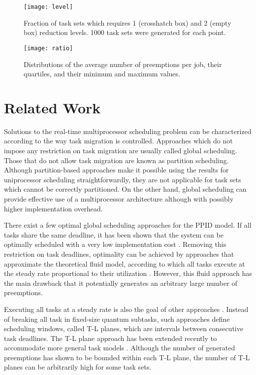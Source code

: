 \documentclass[twocolumn, compsocconf]{IEEEtran}
\newcounter{proc}
\begin{document}
\begin{figure}[t]
\texttt{[image: level]}
  \caption{Fraction of task sets which requires 1 (crosshatch box) and 2 (empty
    box) reduction levels. 1000 task sets were generated for each point.}
  \label{fig:level}
\end{figure}

\begin{figure}[t]
\texttt{[image: ratio]}
  \caption{Distributions of the average number of preemptions per job, their
    quartiles, and their minimum and maximum values.}
  \label{fig:ratio}
\end{figure}

\section{Related Work}\label{sec:relatedWork}

Solutions to the real-time multiprocessor scheduling problem can be
characterized according to the way task migration is controlled. Approaches
which do not impose any restriction on task migration are usually called global
scheduling. Those that do not allow task migration are known as partition
scheduling. Although partition-based approaches make it possible using the
results for uniprocessor scheduling straightforwardly, they are not applicable
for task sets which cannot be correctly partitioned. On the other hand, global
scheduling can provide effective use of a multiprocessor architecture although
with possibly higher implementation overhead.

There exist a few optimal global scheduling approaches for the PPID model. If
all tasks share the same deadline, it has been shown that the system can be
optimally scheduled with a very low implementation cost
\cite{McNaughton59}. Removing this restriction on task deadlines, optimality can
be achieved by approaches that approximate the theoretical fluid model,
according to which all tasks execute at the steady rate proportional to their
utilization \cite{Baruah96}. However, this fluid approach has the main drawback
that it potentially generates an arbitrary large number of preemptions.

Executing all tasks at a steady rate is also the goal of other approaches
\cite{Cho06,Funaoka08}. Instead of breaking all task in fixed-size quantum
subtasks, such approaches define scheduling windows, called T-L planes, which
are intervals between consecutive task deadlines.
The T-L plane approach has been extended recently to accommodate more general
task models \cite{Funk10}. Although the number of generated preemptions has
shown to be bounded within each T-L plane, the number of T-L planes can be
arbitrarily high for some task sets.
\end{document}
